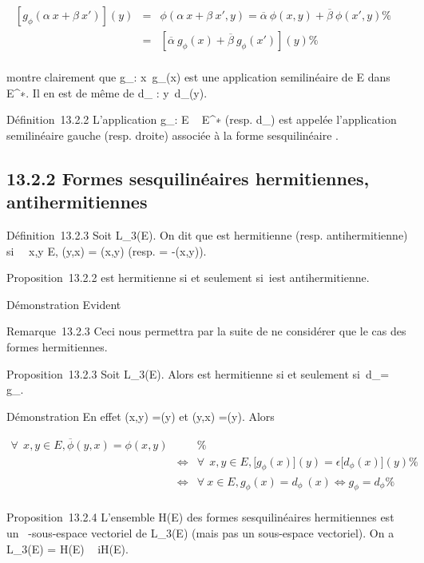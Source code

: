 \documentclass[]{article}
\begin{document}
\begin{align*} \left
[g_\phi(\alpha~x + \beta~x')\right ](y)& =& \phi(\alpha~x +
\beta~x',y) = \overline\alpha~\phi(x,y) +
\overline\beta~\phi(x',y)\%&
\\ & =& \left
[\overline\alpha~g_\phi(x) +
\overline\beta~g_\phi(x')\right
](y) \%& \\
\end{align*}

montre clairement que g_\phi :
x\mapsto~g_\phi(x) est une application
semilinéaire de E dans E^∗. Il en est de même de d_\phi
: y\mapsto~d_\phi(y).

Définition~13.2.2 L'application g_\phi : E \rightarrow~ E^∗ (resp.
d_\phi) est appelée l'application semilinéaire gauche (resp.
droite) associée à la forme sesquilinéaire \phi.

\subsection{13.2.2 Formes sesquilinéaires hermitiennes, antihermitiennes}

Définition~13.2.3 Soit \phi \in L_3(E). On dit que \phi est
hermitienne (resp. antihermitienne) si \forall~~x,y \in
E, \phi(y,x) = \overline\phi(x,y) (resp. =
-\overline\phi(x,y)).

Proposition~13.2.2 \phi est hermitienne si et seulement si~i\phi est
antihermitienne.

Démonstration Evident

Remarque~13.2.3 Ceci nous permettra par la suite de ne considérer que le
cas des formes hermitiennes.

Proposition~13.2.3 Soit \phi \in L_3(E). Alors \phi est hermitienne
si et seulement si~d_\phi = g_\phi.

Démonstration En effet \phi(x,y) =(y) et
\overline\phi(y,x) =(y). Alors

\begin{align*} \forall~~x,y \in E,
\overline\phi(y,x) = \phi(x,y)&& \%&
\\ & \Leftrightarrow &
\forall~~x,y \in E, \big
[g_\phi(x)\big ](y) = \epsilon\big
[d_\phi(x)\big ](y)\%&
\\ & \Leftrightarrow &
\forall~x \in E, g_\phi(x) = d_\phi~(x)
\Leftrightarrow g_\phi = d_\phi \%&
\\ \end{align*}

Proposition~13.2.4 L'ensemble H(E) des formes sesquilinéaires
hermitiennes est un ~-sous-espace vectoriel de L_3(E) (mais
pas un  sous-espace vectoriel). On a L_3(E) = H(E) \oplus~ iH(E).
\end{document}
